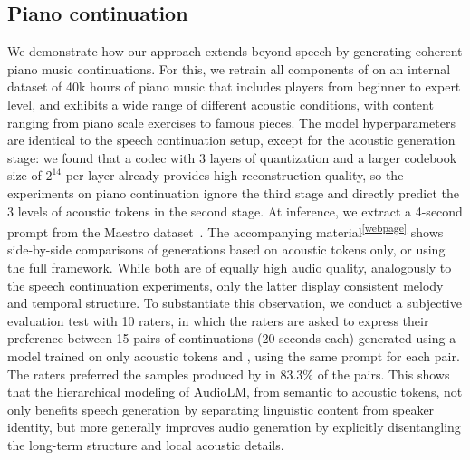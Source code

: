 \documentclass[letterpaper,10 pt]{IEEEtran}
\begin{document}
\subsection{Piano continuation} \label{sec:piano-continuation}
We demonstrate how our approach extends beyond speech by  generating coherent piano music continuations. For this, we retrain all components of \ours{} on an internal dataset of 40k hours of piano music that includes players from beginner to expert level, and exhibits a wide range of different acoustic conditions, with content ranging from piano scale exercises to famous pieces. The model hyperparameters are identical to the speech continuation setup, except for the acoustic generation stage: we found that a codec with 3 layers of quantization and a larger codebook size of $2^{14}$ per layer already provides high reconstruction quality, so the experiments on piano continuation ignore the third stage and directly predict the 3 levels of acoustic tokens in the second stage.
At inference, we extract a 4-second prompt from the Maestro dataset~\cite{maestro}. The accompanying material\textsuperscript{\ref{webpage}} shows side-by-side comparisons of generations based on acoustic tokens only, or using the full \ours{} framework. While both are of equally high audio quality, analogously to the speech continuation experiments, only the latter display consistent melody and temporal structure. To substantiate this observation, we conduct a subjective evaluation test with 10 raters, in which the raters are asked to express their preference between 15 pairs of continuations (20 seconds each) generated using a model trained on only acoustic tokens and \ours{}, using the same prompt for each pair. The raters preferred the samples produced by \ours{} in 83.3\% of the pairs. This shows that the hierarchical modeling of AudioLM, from semantic to acoustic tokens, not only benefits speech generation by separating linguistic content from speaker identity, but more generally improves audio generation by explicitly disentangling the long-term structure and local acoustic details.
\end{document}
